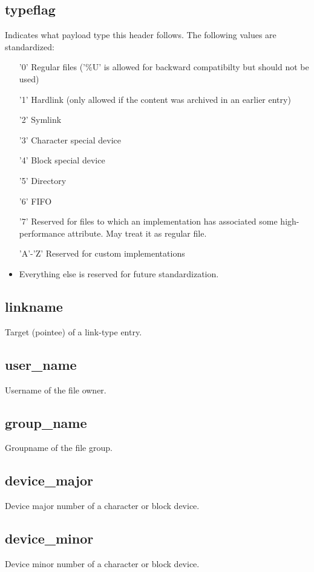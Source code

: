 \subsection{typeflag}
Indicates what payload type this header follows. The following values are
standardized:
\begin{itemize}
	\item['0'] Regular files ('\%U' is allowed for backward compatibilty but
		should not be used)
	\item['1'] Hardlink (only allowed if the content was archived in an earlier
		entry)
	\item['2'] Symlink
	\item['3'] Character special device
	\item['4'] Block special device
	\item['5'] Directory
	\item['6'] FIFO
	\item['7'] Reserved for files to which an implementation has associated some
		high-performance attribute. May treat it as regular file.
	\item['A'-'Z'] Reserved for custom implementations
	\item Everything else is reserved for future standardization.
\end{itemize}

\subsection{linkname}
Target (pointee) of a link-type entry.

\subsection{user\_name}
Username of the file owner.

\subsection{group\_name}
Groupname of the file group.

\subsection{device\_major}
Device major number of a character or block device.

\subsection{device\_minor}
Device minor number of a character or block device.
